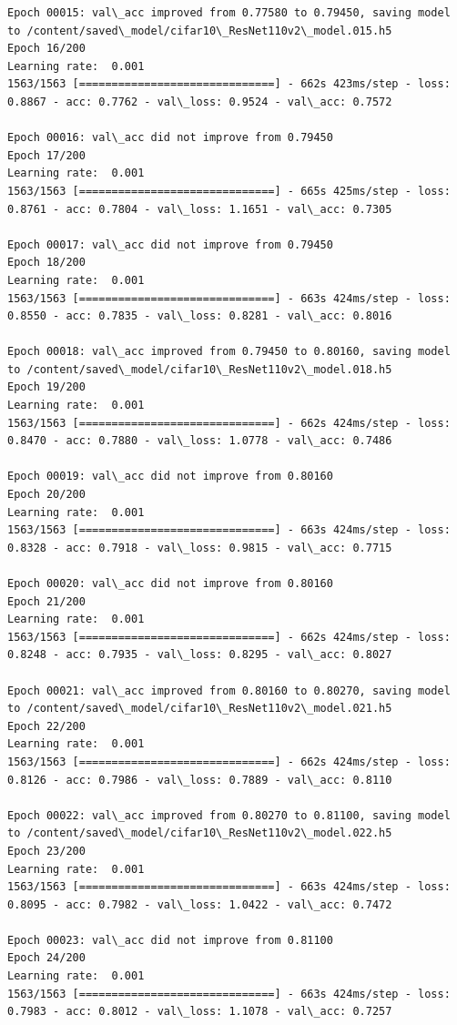 \documentclass[11pt]{article}
\begin{document}
\begin{Verbatim}[commandchars=\\\{\}]
Epoch 00015: val\_acc improved from 0.77580 to 0.79450, saving model to /content/saved\_model/cifar10\_ResNet110v2\_model.015.h5
Epoch 16/200
Learning rate:  0.001
1563/1563 [==============================] - 662s 423ms/step - loss: 0.8867 - acc: 0.7762 - val\_loss: 0.9524 - val\_acc: 0.7572

Epoch 00016: val\_acc did not improve from 0.79450
Epoch 17/200
Learning rate:  0.001
1563/1563 [==============================] - 665s 425ms/step - loss: 0.8761 - acc: 0.7804 - val\_loss: 1.1651 - val\_acc: 0.7305

Epoch 00017: val\_acc did not improve from 0.79450
Epoch 18/200
Learning rate:  0.001
1563/1563 [==============================] - 663s 424ms/step - loss: 0.8550 - acc: 0.7835 - val\_loss: 0.8281 - val\_acc: 0.8016

Epoch 00018: val\_acc improved from 0.79450 to 0.80160, saving model to /content/saved\_model/cifar10\_ResNet110v2\_model.018.h5
Epoch 19/200
Learning rate:  0.001
1563/1563 [==============================] - 662s 424ms/step - loss: 0.8470 - acc: 0.7880 - val\_loss: 1.0778 - val\_acc: 0.7486

Epoch 00019: val\_acc did not improve from 0.80160
Epoch 20/200
Learning rate:  0.001
1563/1563 [==============================] - 663s 424ms/step - loss: 0.8328 - acc: 0.7918 - val\_loss: 0.9815 - val\_acc: 0.7715

Epoch 00020: val\_acc did not improve from 0.80160
Epoch 21/200
Learning rate:  0.001
1563/1563 [==============================] - 662s 424ms/step - loss: 0.8248 - acc: 0.7935 - val\_loss: 0.8295 - val\_acc: 0.8027

Epoch 00021: val\_acc improved from 0.80160 to 0.80270, saving model to /content/saved\_model/cifar10\_ResNet110v2\_model.021.h5
Epoch 22/200
Learning rate:  0.001
1563/1563 [==============================] - 662s 424ms/step - loss: 0.8126 - acc: 0.7986 - val\_loss: 0.7889 - val\_acc: 0.8110

Epoch 00022: val\_acc improved from 0.80270 to 0.81100, saving model to /content/saved\_model/cifar10\_ResNet110v2\_model.022.h5
Epoch 23/200
Learning rate:  0.001
1563/1563 [==============================] - 663s 424ms/step - loss: 0.8095 - acc: 0.7982 - val\_loss: 1.0422 - val\_acc: 0.7472

Epoch 00023: val\_acc did not improve from 0.81100
Epoch 24/200
Learning rate:  0.001
1563/1563 [==============================] - 663s 424ms/step - loss: 0.7983 - acc: 0.8012 - val\_loss: 1.1078 - val\_acc: 0.7257


\end{Verbatim}
\end{document}
